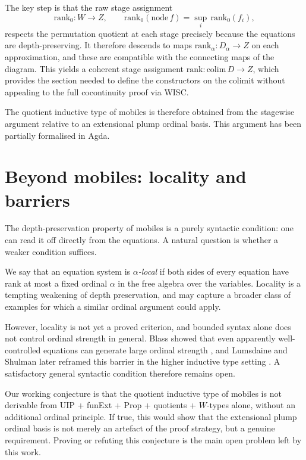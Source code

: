 \documentclass{easychair}
\begin{document}
The key step is that the raw stage assignment
\[
  \mathrm{rank}_0 : W \to Z,
  \qquad
  \mathrm{rank}_0(\mathrm{node}\,f) = \sup_i\,\mathrm{rank}_0(f_i),
\]
respects the permutation quotient at each stage precisely because the
equations are depth-preserving. It therefore descends to maps
\(\mathrm{rank}_\alpha : D_\alpha \to Z\) on each approximation, and
these are compatible with the connecting maps of the diagram. This yields
a coherent stage assignment
\(\mathrm{rank} : \mathrm{colim}\,D \to Z\),
which provides the section needed to define the constructors on the
colimit without appealing to the full cocontinuity proof via WISC\@.

The quotient inductive type of mobiles is therefore obtained from the
stagewise argument relative to an extensional plump ordinal basis. This
argument has been partially formalised in Agda.

\section{Beyond mobiles: locality and barriers}

The depth-preservation property of mobiles is a purely syntactic
condition: one can read it off directly from the equations. A natural
question is whether a weaker condition suffices.

We say that an equation system is \emph{\(\alpha\)-local} if both sides
of every equation have rank at most a fixed ordinal \(\alpha\) in the
free algebra over the variables. Locality is a tempting weakening of
depth preservation, and may capture a broader class of examples for
which a similar ordinal argument could apply.

However, locality is not yet a proved criterion, and bounded syntax alone
does not control ordinal strength in general. Blass showed that even
apparently well-controlled equations can generate large ordinal strength
\cite{blass1983-words}, and Lumsdaine and Shulman later reframed this
barrier in the higher inductive type setting \cite{lumsdaine2020-hit}.
A satisfactory general syntactic condition therefore remains open.

Our working conjecture is that the quotient inductive type of mobiles is
not derivable from UIP + funExt + Prop + quotients + \(W\)-types alone,
without an additional ordinal principle. If true, this would show that
the extensional plump ordinal basis is not merely an artefact of the
proof strategy, but a genuine requirement. Proving or refuting this
conjecture is the main open problem left by this work.
\end{document}
